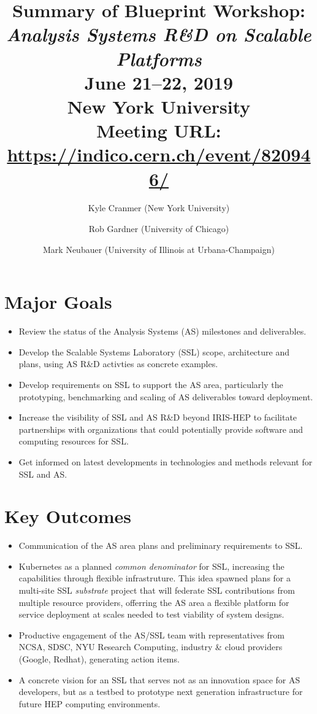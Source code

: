 \documentclass[11pt,letterpaper,fleqn]{article}
\date{} %
\title{\large Summary of Blueprint Workshop: \\
\vspace{1pt}
\LARGE \textit{Analysis Systems R\&D on Scalable Platforms} \\
\color{black} \normalsize
\vspace{10pt}
June 21--22, 2019 \\
New York University \\
Meeting URL: \href{https://indico.cern.ch/event/820946/}{https://indico.cern.ch/event/820946/}
} %
\author{Kyle Cranmer {\normalfont(New York University)}
      \and  Rob Gardner {\normalfont(University of Chicago)}
      \and  Mark Neubauer {\normalfont(University of Illinois at Urbana-Champaign)}
      }
\begin{document}
\maketitle %
\normalfont

\thispagestyle{firststyle}

\vspace{-45pt}

\section*{Major Goals}
\vspace{3pt}
\begin{itemize}
  \item Review the status of the Analysis Systems (AS) milestones and deliverables.
  \item Develop the Scalable Systems Laboratory (SSL) scope, architecture and plans, using AS R\&D activties as concrete examples.
  \item Develop requirements on SSL to support the AS area, particularly the prototyping, benchmarking and scaling of AS deliverables toward deployment.
  \item Increase the visibility of SSL and AS R\&D beyond IRIS-HEP to facilitate partnerships with organizations that could potentially provide software and computing resources for SSL.
  \item Get informed on latest developments in technologies and methods relevant for SSL and AS.
\end{itemize}

\section*{Key Outcomes}
\vspace{3pt}
\begin{itemize}
  \item Communication of the AS area plans and preliminary requirements to SSL.
  \item Kubernetes as a planned {\it common denominator} for SSL, increasing the capabilities through flexible infrastruture. This idea spawned plans for a multi-site SSL {\it substrate} project that will federate SSL contributions from multiple resource providers, offerring the AS area a flexible platform for service deployment at scales needed to test viability of system designs. 
  \item Productive engagement of the AS/SSL team with representatives from NCSA, SDSC, NYU Research Computing, industry \& cloud providers (Google, Redhat), generating action items.
  \item A concrete vision for an SSL that serves not as an innovation space for AS developers, but as a testbed to prototype next generation infrastructure for future HEP computing environments.

\end{itemize}
\end{document}
